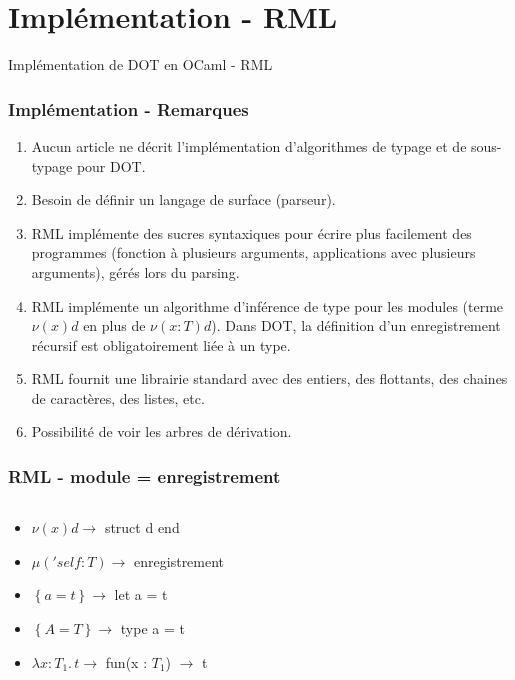 \documentclass{beamer}
\newcommand{\lambdaExpr}[2]{\lambda #1 . \, #2}
\begin{document}
\section{Implémentation - RML}

\begin{frame}
	\begin{center}
		\Huge{Implémentation de DOT en OCaml - RML}
	\end{center}
\end{frame}

\begin{frame}
  \frametitle{Implémentation - Remarques}
	\begin{center}
    \begin{enumerate}
      \item Aucun article ne décrit l'implémentation d'algorithmes de typage et
        de sous-typage pour DOT.
      \item Besoin de définir un langage de surface (parseur).
      \item RML implémente des sucres syntaxiques pour écrire plus
        facilement des programmes (fonction à plusieurs arguments, applications
        avec plusieurs arguments), gérés lors du parsing.
      \item RML implémente un algorithme d'inférence de type pour les modules
        (terme $\nu(x)d$ en plus de $\nu(x : T)d$).
        Dans DOT, la définition d'un enregistrement récursif est obligatoirement liée à un type.
      \item RML fournit une librairie standard avec des entiers, des flottants,
        des chaines de caractères, des listes, etc.
      \item Possibilité de voir les arbres de dérivation.
      \end{enumerate}
	\end{center}
\end{frame}

\begin{frame}
  \frametitle{RML - module = enregistrement}
  \inputminted{OCaml}{codes/point2d.rml}
  \begin{itemize}
  \item $\nu(x) d \rightarrow$ struct d end
  \item $\mu('self : T) \rightarrow$ enregistrement
  \item $\left\{ a = t \right\} \rightarrow$ let a = t
  \item $\left\{ A = T \right\} \rightarrow$ type a = t
  \item $\lambdaExpr{x : T_{1}}{t} \rightarrow$ fun(x : $T_{1}$) $\rightarrow$ t
  \end{itemize}
\end{frame}
\end{document}
